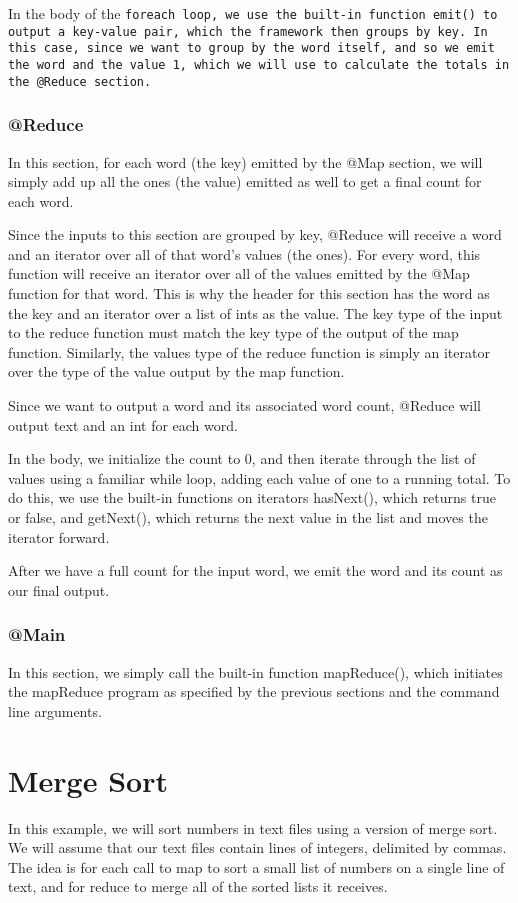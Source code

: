 \documentclass{article} \usepackage{fancyhdr, multicol}
\begin{document}
In the body of the \tt foreach \rm loop, we use the built-in function \tt emit()
\rm to output a key-value pair, which the framework then groups by key. In this
case, since we want to group by the word itself, and so we emit the word and the
value \tt 1\rm, which we will use to calculate the totals in the \tt @Reduce \rm
section.

\subsubsection*{@Reduce}
In this section, for each word (the key) emitted by the @Map section, we will simply add up all the ones (the value) emitted as well to get a final count for each word. 

Since the inputs to this section are grouped by key, @Reduce will receive a word and an iterator over all of that word's values (the ones). For every word, this function will receive an iterator over all of the values emitted by the @Map function for that word. This is why the header for this section has the word as the key and an iterator over a list of ints as the value. The key type of the input to the reduce function must match the key type of the output of the map function. Similarly, the values type of the reduce function is simply an iterator over the type of the value output by the map function.

Since we want to output a word and its associated word count, @Reduce will output text and an int for each word.

In the body, we initialize the count to 0, and then iterate through the list of values using a familiar while loop, adding each value of one to a running total. To do this, we use the built-in functions on iterators hasNext(), which returns true or false, and getNext(), which returns the next value in the list and moves the iterator forward. 

After we have a full count for the input word, we emit the word and its count as our final output.

\subsubsection*{@Main}
In this section, we simply call the built-in function mapReduce(), which initiates the mapReduce program as specified by the previous sections and the command line arguments.


\section*{Merge Sort}
\label{merge_sort}
In this example, we will sort numbers in text files using a version of merge sort. We will assume that our text files contain lines of integers, delimited by commas. The idea is for each call to map to sort a small list of numbers on a single line of text, and for reduce to merge all of the sorted lists it receives.
\end{document}
